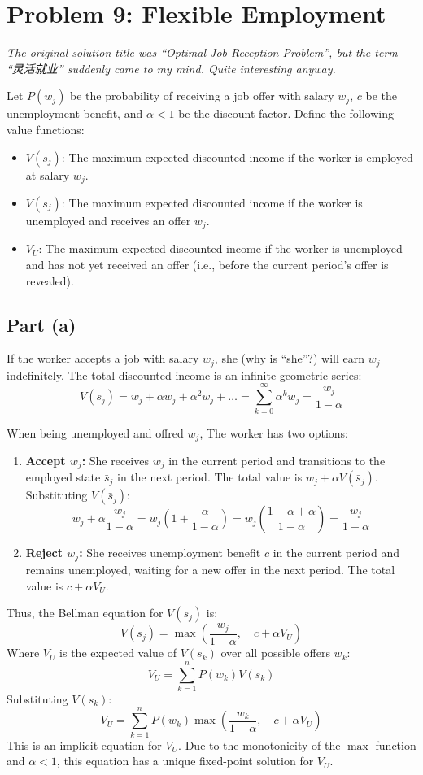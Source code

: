 \documentclass[11pt, a4paper, oneside]{memoir}
\begin{document}
\chapter{Problem 9: Flexible Employment}
\textit{The original solution title was ``Optimal Job Reception Problem'', but the term ``灵活就业'' suddenly came to my mind. Quite interesting anyway.}

Let $P(w_j)$ be the probability of receiving a job offer with salary $w_j$, $c$ be the unemployment benefit,
and $\alpha < 1$ be the discount factor. Define the following value functions:
\begin{itemize}
    \item $V(\bar{s}_j)$: The maximum expected discounted income if the worker is employed at salary $w_j$.
    \item $V(s_j)$: The maximum expected discounted income if the worker is unemployed and receives an offer $w_j$.
    \item $V_U$: The maximum expected discounted income if the worker is unemployed and has not yet received an offer (i.e., before the current period's offer is revealed).
\end{itemize}

\section{Part (a)}
If the worker accepts a job with salary $w_j$, she (why is ``she''?) will earn $w_j$ indefinitely.
The total discounted income is an infinite geometric series:
\[ V(\bar{s}_j) = w_j + \alpha w_j + \alpha^2 w_j + \dots = \sum_{k=0}^\infty \alpha^k w_j = \frac{w_j}{1-\alpha} \]

When being unemployed and offred $w_j$, The worker has two options:
\begin{enumerate}
    \item \textbf{Accept $w_j$:} She receives $w_j$ in the current period and transitions to the employed state $\bar{s}_j$
    in the next period. The total value is $w_j + \alpha V(\bar{s}_j)$. Substituting $V(\bar{s}_j)$:
    \[ w_j + \alpha \frac{w_j}{1-\alpha} = w_j \left(1 + \frac{\alpha}{1-\alpha}\right) = w_j \left(\frac{1-\alpha+\alpha}{1-\alpha}\right) = \frac{w_j}{1-\alpha} \]
    \item \textbf{Reject $w_j$:} She receives unemployment benefit $c$ in the current period and remains unemployed,
    waiting for a new offer in the next period. The total value is $c + \alpha V_U$.
\end{enumerate}
Thus, the Bellman equation for $V(s_j)$ is:
\[ V(s_j) = \max \left( \frac{w_j}{1-\alpha}, \quad c + \alpha V_U \right) \]
Where $V_U$ is the expected value of $V(s_k)$ over all possible offers $w_k$:
\[ V_U = \sum_{k=1}^n P(w_k) V(s_k) \]
Substituting $V(s_k)$:
\[ V_U = \sum_{k=1}^n P(w_k) \max \left( \frac{w_k}{1-\alpha}, \quad c + \alpha V_U \right) \]
This is an implicit equation for $V_U$. Due to the monotonicity of the $\max$ function and $\alpha < 1$,
this equation has a unique fixed-point solution for $V_U$.
\end{document}
